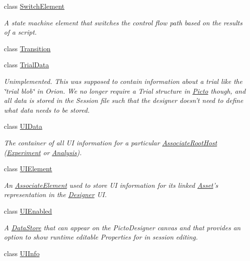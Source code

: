 \begin{DoxyCompactItemize}
class \hyperlink{class_picto_1_1_switch_element}{Switch\-Element}
\begin{DoxyCompactList}\small\item\em A state machine element that switches the control flow path based on the results of a script. \end{DoxyCompactList}\item 
class \hyperlink{class_picto_1_1_transition}{Transition}
\item 
class \hyperlink{class_picto_1_1_trial_data}{Trial\-Data}
\begin{DoxyCompactList}\small\item\em Unimplemented. This was supposed to contain information about a trial like the \char`\"{}trial blob\char`\"{} in Orion. We no longer require a Trial structure in \hyperlink{namespace_picto}{Picto} though, and all data is stored in the Session file such that the designer doesn't need to define what data needs to be stored. \end{DoxyCompactList}\item 
class \hyperlink{class_picto_1_1_u_i_data}{U\-I\-Data}
\begin{DoxyCompactList}\small\item\em The container of all U\-I information for a particular \hyperlink{class_picto_1_1_associate_root_host}{Associate\-Root\-Host} (\hyperlink{class_picto_1_1_experiment}{Experiment} or \hyperlink{class_picto_1_1_analysis}{Analysis}). \end{DoxyCompactList}\item 
class \hyperlink{class_picto_1_1_u_i_element}{U\-I\-Element}
\begin{DoxyCompactList}\small\item\em An \hyperlink{class_picto_1_1_associate_element}{Associate\-Element} used to store U\-I information for its linked \hyperlink{class_picto_1_1_asset}{Asset}'s representation in the \hyperlink{class_designer}{Designer} U\-I. \end{DoxyCompactList}\item 
class \hyperlink{class_picto_1_1_u_i_enabled}{U\-I\-Enabled}
\begin{DoxyCompactList}\small\item\em A \hyperlink{class_picto_1_1_data_store}{Data\-Store} that can appear on the Picto\-Designer canvas and that provides an option to show runtime editable Properties for in session editing. \end{DoxyCompactList}\item 
class \hyperlink{class_picto_1_1_u_i_info}{U\-I\-Info}

\end{DoxyCompactItemize}
